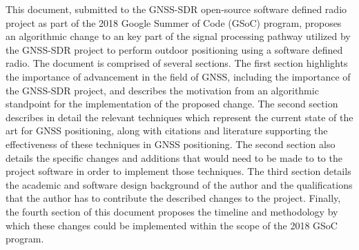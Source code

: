 This document, submitted to the GNSS-SDR open-source software defined radio project as part of the 2018 Google Summer of Code (GSoC) program, proposes an algorithmic change to an key part of the signal processing pathway utilized by the GNSS-SDR project to perform outdoor positioning using a software defined radio. The document is comprised of several sections. The first section highlights the importance of advancement in the field of GNSS, including the importance of the GNSS-SDR project, and describes the motivation from an algorithmic standpoint for the implementation of the proposed change. The second section describes in detail the relevant techniques which represent the current state of the art for GNSS positioning, along with citations and literature supporting the effectiveness of these techniques in GNSS positioning. The second section also details the specific changes and additions that would need to be made to to the project software in order to implement those techniques. The third section details the academic and software design background of the author and the qualifications that the author has to contribute the described changes to the project. Finally, the fourth section of this document proposes the timeline and methodology by which these changes could be implemented within the scope of the 2018 GSoC program.

